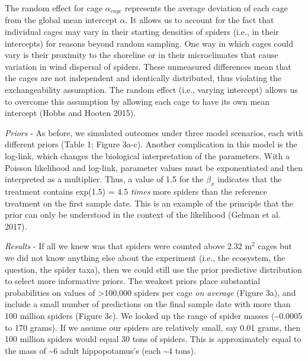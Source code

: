 \documentclass[
  12pt,
]{article}
\begin{document}
The random effect for cage \(\alpha_{cage}\) represents the average
deviation of each cage from the global mean intercept \(\alpha\). It
allows us to account for the fact that individual cages may vary in
their starting densities of spiders (i.e., in their intercepts) for
reasons beyond random sampling. One way in which cages could vary is
their proximity to the shoreline or in their microclimates that cause
variation in wind dispersal of spiders. These unmeasured differences
mean that the cages are not independent and identically distributed,
thus violating the exchangeability assumption. The random effect (i.e.,
varying intercept) allows us to overcome this assumption by allowing
each cage to have its own mean intercept (Hobbs and Hooten 2015).

\emph{Priors} - As before, we simulated outcomes under three model
scenarios, each with different priors (Table 1; Figure 3a-c). Another
complication in this model is the log-link, which changes the biological
interpretation of the parameters. With a Poisson likelihood and
log-link, parameter values must be exponentiated and then interpreted as
a multiplier. Thus, a value of 1.5 for the \(\beta_x\) indicates that
the treatment contains exp(1.5) = 4.5 \emph{times} more spiders than the
reference treatment on the first sample date. This is an example of the
principle that the prior can only be understood in the context of the
likelihood (Gelman et al. 2017).

\emph{Results} - If all we knew was that spiders were counted above 2.32
m\(^2\) cages but we did not know anything else about the experiment
(i.e., the ecosystem, the question, the spider taxa), then we could
still use the prior predictive distribution to select more informative
priors. The weakest priors place substantial probabilities on values of
\textgreater100,000 spiders per cage \emph{on average} (Figure 3a), and
include a small number of predictions on the final sample date with more
than 100 million spiders (Figure 3c). We looked up the range of spider
masses (\textasciitilde0.0005 to 170 grams). If we assume our spiders
are relatively small, say 0.01 grams, then 100 million spiders would
equal 30 tons of spiders. This is approximately equal to the mass of
\textasciitilde6 adult hippopotamus's (each \textasciitilde4 tons).
\end{document}
